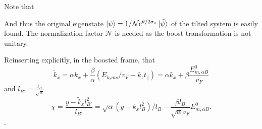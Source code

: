Note that


And thus the original eigenstate \(\ket{\psi } = 1 /\mathcal{N} e^{\theta /2 \sigma _{x}} \ket{\tilde{\psi} }\) of the tilted system is easily found.
The normalization factor \( \mathcal{N} \) is needed as the boost transformation is not unitary.


Reinserting explicitly, in the boosted frame, that
\[
  \tilde{k}_{x} = \alpha k_{x} + \frac{\beta}{\alpha} (E_{k_z m s} /v_F- k_{z} t_{\parallel})
  = \alpha k_x + \beta \frac{E^0_{m, \alpha B} }{v_{F}}
\]
and \(l_{B'}=\frac{l_{B}}{\sqrt{\alpha} }\)
\begin{equation}
  \label{eq:56}
  \chi =
  \frac{y-\tilde{k}_{x} l_{B'}^2}{l_{B'}}
  =
  \sqrt{\alpha } (y-k_{x} l_{B}^2) /l_{B}
  - \frac{ \beta l_B }{ \sqrt{\alpha} v_F} E^{0}_{m, \alpha B}.
\end{equation}.


